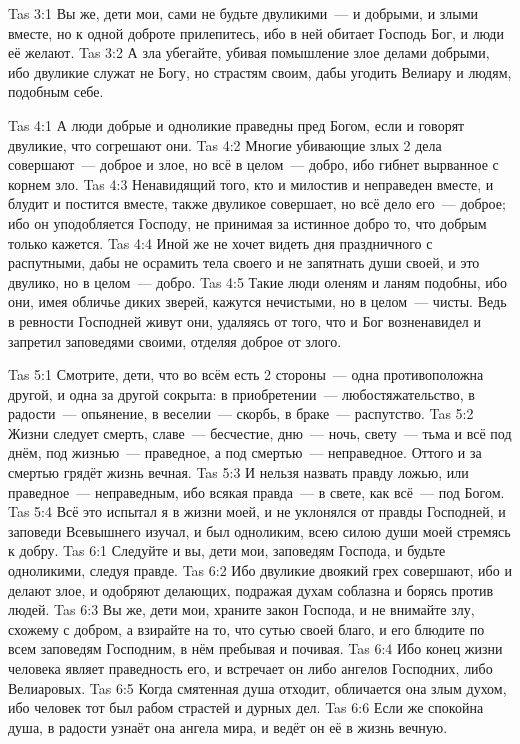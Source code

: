 \vs Tas 3:1
Вы же, дети мои, сами не будьте двуликими~--- и добрыми,
и злыми вместе, но к одной доброте прилепитесь,
ибо в ней обитает Господь Бог,
и люди её желают.
\vs Tas 3:2
А зла убегайте, убивая помышление злое делами добрыми,
ибо двуликие служат не Богу, но страстям своим,
дабы угодить Велиару и людям, подобным себе.

\vs Tas 4:1
А люди добрые и одноликие праведны пред Богом,
если и говорят двуликие, что согрешают они.
\vs Tas 4:2
Многие убивающие злых 2 дела совершают~--- доброе и злое,
но всё в целом~--- добро, ибо гибнет вырванное с корнем зло.
\vs Tas 4:3
Ненавидящий того, кто и милостив и неправеден вместе,
и блудит и постится вместе, также двуликое совершает,
но всё дело его~--- доброе;
ибо он уподобляется Господу, не принимая за истинное добро то,
что добрым только кажется.
\vs Tas 4:4
Иной же не хочет видеть дня праздничного с распутными,
дабы не осрамить тела своего и не запятнать души своей,
и это двулико, но в целом~--- добро.
\vs Tas 4:5
Такие люди оленям и ланям подобны, ибо они,
имея обличье диких зверей, кажутся нечистыми,
но в целом~--- чисты.
Ведь в ревности Господней живут они, удаляясь от того,
что и Бог возненавидел и запретил заповедями своими,
отделяя доброе от злого.

\vs Tas 5:1
Смотрите, дети, что во всём есть
2 стороны~--- одна противоположна другой,
и одна за другой сокрыта:
в приобретении~--- любостяжательство,
в радости~--- опьянение,
в веселии~--- скорбь,
в браке~--- распутство.
\vs Tas 5:2
Жизни следует смерть,
славе~--- бесчестие,
дню~--- ночь,
свету~--- тьма
и всё под днём, под жизнью~--- праведное, а под смертью~--- неправедное.
Оттого и за смертью грядёт жизнь вечная.
\vs Tas 5:3
И нельзя назвать правду ложью,
или праведное~--- неправедным,
ибо всякая правда~--- в свете, как всё~--- под Богом.
\vs Tas 5:4
Всё это испытал я в жизни моей,
и не уклонялся от правды Господней,
и заповеди Всевышнего изучал,
и был одноликим, всею силою души моей стремясь к добру.
\vs Tas 6:1
Следуйте и вы, дети мои, заповедям Господа,
и будьте одноликими, следуя правде.
\vs Tas 6:2
Ибо двуликие двоякий грех совершают,
ибо и делают злое, и одобряют делающих,
подражая духам соблазна и борясь против людей.
\vs Tas 6:3
Вы же, дети мои, храните закон Господа,
и не внимайте злу, схожему с добром,
а взирайте на то, что сутью своей благо,
и его блюдите по всем заповедям Господним,
в нём пребывая и почивая.
\vs Tas 6:4
Ибо конец жизни человека являет праведность его,
и встречает он либо ангелов Господних, либо Велиаровых.
\vs Tas 6:5
Когда смятенная душа отходит,
обличается она злым духом,
ибо человек тот был рабом страстей и дурных дел.
\vs Tas 6:6
Если же спокойна душа,
в радости узнаёт она ангела мира,
и ведёт он её в жизнь вечную.

